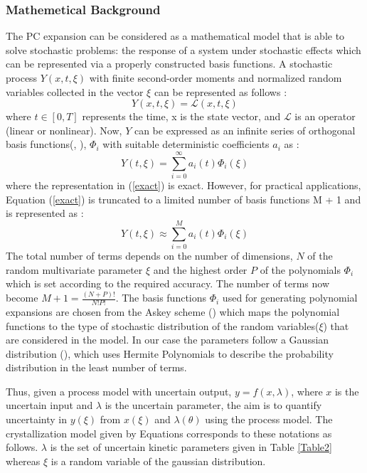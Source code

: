 \documentclass[3p,times,authoryear]{elsarticle}
\begin{document}
\subsubsection{Mathemetical Background}
The PC expansion can be considered as a mathematical model that is able to solve stochastic problems: the response of a system under stochastic effects which can be represented via a properly constructed basis functions. A stochastic process $Y(x,t,\xi)$ with finite second-order moments and normalized random variables collected in the vector $\xi$ can be represented as follows : 
\begin{equation}
Y(x,t,\xi) = \mathcal{L}(x,t,\xi)
\end{equation}
where $t \in [0, T]$ represents the time, x is the state vector, and $\mathcal{L}$ is an operator (linear or nonlinear).
Now, $Y$ can be expressed as an infinite series of orthogonal basis functions(\cite{ghanem}, \cite{ghanem1997}), $\Phi_{i}$ with suitable deterministic coefficients $a_{i}$ as :
\begin{equation} \label{exact}
Y(t,\xi) =  \sum_{i=0}^{\infty} a_{i}(t)\Phi_{i}(\xi)
\end{equation}
where the representation in (\ref{exact}) is exact. However, for practical applications, Equation (\ref{exact}) is
truncated to a limited number of basis functions M + 1 and is represented as :
\begin{equation} \label{approx}
Y(t,\xi) \approx \sum_{i=0}^{M} a_{i}(t)\Phi_{i}(\xi)
\end{equation}
The total number of terms depends on the number of dimensions, $N$ of the random multivariate parameter $\xi$ and the highest order $P$ of the polynomials $\Phi_{i}$ which is set according to the required accuracy. The number of terms now become $ M + 1 = \frac{(N+P)!}{N!P!} $. The basis functions $\Phi_{i}$ used for generating polynomial expansions  are chosen from the Askey scheme (\cite{xiuwiener}) which maps the polynomial functions to the type of stochastic distribution of the random variables($\xi$) that are considered in the model. In our case the parameters follow a Gaussian distribution (\cite{yenkie}), which uses Hermite Polynomials to describe the probability distribution in the least number of terms.
\par
Thus, given a process model with uncertain output, $y = f(x,\lambda)$, where $x$ is the uncertain input and $\lambda$ is the uncertain parameter, the aim is to quantify uncertainty in $y(\xi)$ from $x(\xi)$ and $\lambda(\theta)$ using the process model. The crystallization model given by Equations  corresponds to these notations as follows. $\lambda$ is the set of uncertain kinetic parameters given in Table \ref{Table2} whereas $\xi$ is a random variable of the gaussian distribution.  
\end{document}
